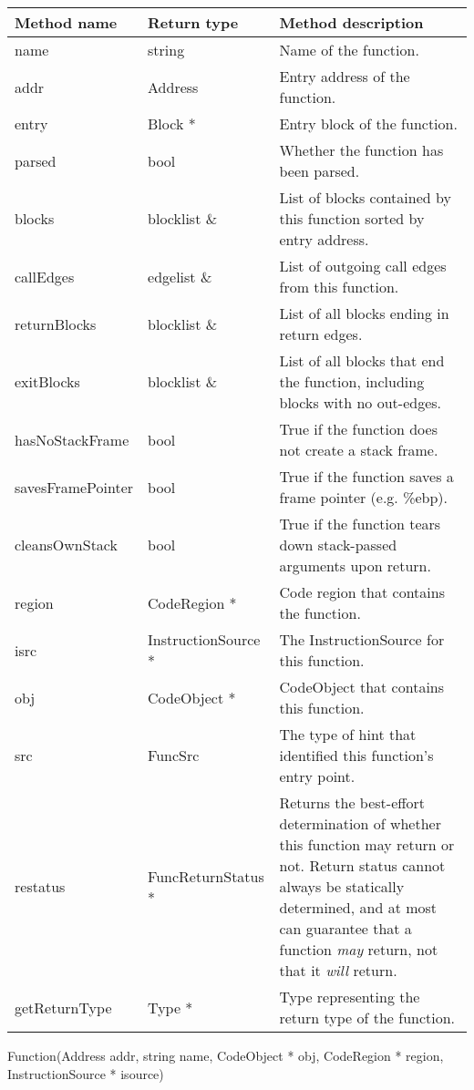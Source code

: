\begin{tabular}{p{1.25in}p{1.125in}p{3.125in}}
\toprule
Method name & Return type & Method description \\
\midrule
name & string & Name of the function. \\
addr & Address & Entry address of the function.  \\
entry & Block * & Entry block of the function. \\
parsed & bool & Whether the function has been parsed. \\
blocks & blocklist \& & List of blocks contained by this function sorted by entry address. \\
callEdges & edgelist \& & List of outgoing call edges from this function. \\
returnBlocks & blocklist \& & List of all blocks ending in return edges. \\
exitBlocks & blocklist \& & List of all blocks that end the function, including blocks with no out-edges. \\
hasNoStackFrame & bool & True if the function does not create a stack frame. \\
savesFramePointer & bool & True if the function saves a frame pointer (e.g. \%ebp). \\
cleansOwnStack & bool & True if the function tears down stack-passed arguments upon return. \\
region & CodeRegion * & Code region that contains the function. \\
isrc & InstructionSource * & The InstructionSource for this function. \\
obj & CodeObject * & CodeObject that contains this function. \\
src & FuncSrc & The type of hint that identified this function's entry point. \\
restatus & FuncReturnStatus * & Returns the best-effort determination of whether this function may return or not. Return status cannot always be statically determined, and at most can guarantee that a function \emph{may} return, not that it \emph{will} return. \\
getReturnType & Type * & Type representing the return type of the function. \\
\bottomrule
\end{tabular}

\begin{apient}
Function(Address addr,
         string name,
         CodeObject * obj,
         CodeRegion * region,
         InstructionSource * isource)
\end{apient}

